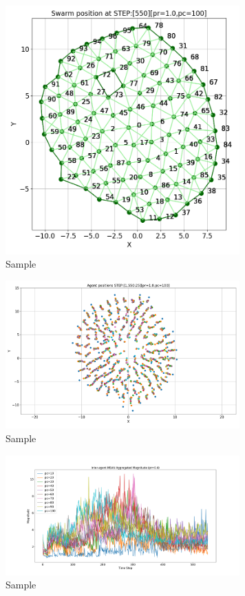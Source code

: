 \documentclass[12pt,a4paper]{IEEEtran}
\begin{document}
\begin{figure}[H]
	\begin{center}
		\includegraphics[width=9cm]{figures/Figure_3}
	\end{center}
	\caption{Sample}
\end{figure}
\begin{figure}[H]
	\begin{center}
		\includegraphics[width=9cm]{figures/Figure_4}
	\end{center}
	\caption{Sample}
\end{figure}
\begin{figure}[H]
	\begin{center}
		\includegraphics[width=9cm]{figures/Figure_5}
	\end{center}
	\caption{Sample}
\end{figure}
\end{document}
